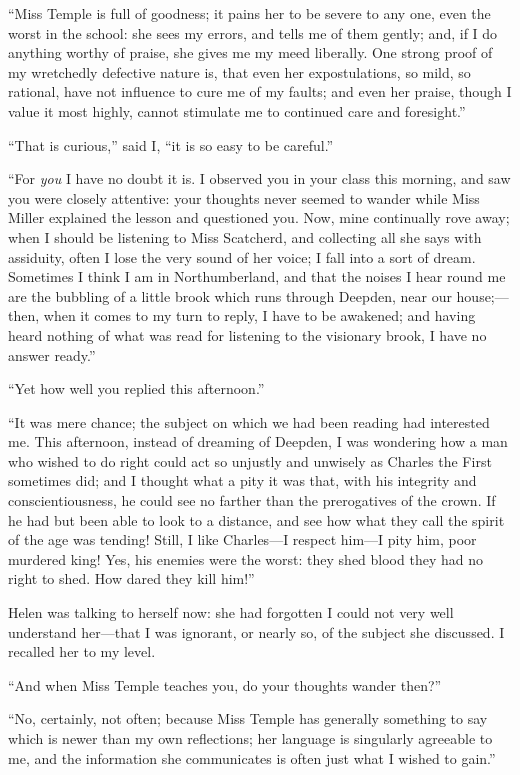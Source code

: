 \enquote{Miss Temple is full of goodness; it pains her to be severe to
any one, even the worst in the school: she sees my errors, and tells me
of them gently; and, if I do anything worthy of praise, she gives me my
meed liberally.  One strong proof of my wretchedly defective nature is,
that even her expostulations, so mild, so rational, have not influence
to cure me of my faults; and even her praise, though I value it most
highly, cannot stimulate me to continued care and foresight.}

\enquote{That is curious,} said I, \enquote{it is so easy to be
careful.}

\enquote{For \emph{you} I have no doubt it is.  I observed you in your class
this morning, and saw you were closely attentive: your thoughts never
seemed to wander while Miss Miller explained the lesson and questioned
you.  Now, mine continually rove away; when I should be listening to
Miss Scatcherd, and collecting all she says with assiduity, often I lose
the very sound of her voice; I fall into a sort of dream.  Sometimes I
think I am in Northumberland, and that the noises I hear round me are
the bubbling of a little brook which runs through Deepden, near our
house;---then, when it comes to my turn to reply, I have to be awakened;
and having heard nothing of what was read for listening to the visionary
brook, I have no answer ready.}

\enquote{Yet how well you replied this afternoon.}

\enquote{It was mere chance; the subject on which we had been reading
had interested me.  This afternoon, instead of dreaming of Deepden, I
was wondering how a man who wished to do right could act so unjustly and
unwisely as Charles the First sometimes did; and I thought what a pity
it was that, with his integrity and conscientiousness, he could see no
farther than the prerogatives of the crown.  If he had but been able to
look to a distance, and see how what they call the spirit of the age was
tending!  Still, I like Charles---I respect him---I pity him, poor
murdered king!  Yes, his enemies were the worst: they shed blood they
had no right to shed.  How dared they kill him!}

Helen was talking to herself now: she had forgotten I could not very
well understand her---that I was ignorant, or nearly so, of the subject
she discussed.  I recalled her to my level.

\enquote{And when Miss Temple teaches you, do your thoughts wander
then?}

\enquote{No, certainly, not often; because Miss Temple has generally
something to say which is newer than my own reflections; her language is
singularly agreeable to me, and the information she communicates is
often just what I wished to gain.}

